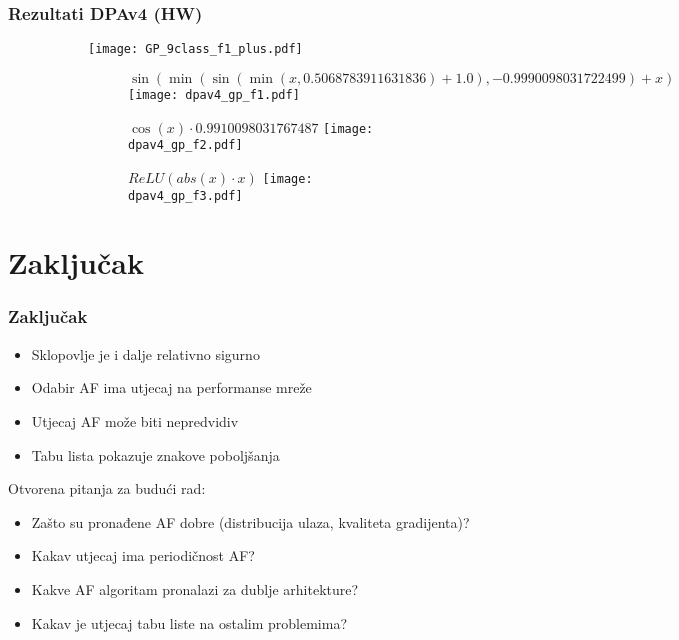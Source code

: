 \documentclass{beamer}
\begin{document}
\begin{frame}
\frametitle{Rezultati DPAv4 (HW)}

\begin{figure}
\centering
\begin{subfigure}{.49\textwidth}
  \centering
  \texttt{[image: GP\_9class\_f1\_plus.pdf]}
\end{subfigure}
\begin{subfigure}{.49\textwidth}
  \centering
  \begin{subfigure}{\linewidth}
    \centering
    \tiny $\sin (\min (\sin (\min (x,0.5068783911631836) + 1.0),-0.9990098031722499) + x)$
    \texttt{[image: dpav4\_gp\_f1.pdf]}
  \end{subfigure}
  \begin{subfigure}{\linewidth}
    \centering
    \vspace{2mm}
	\tiny $\cos (x) \cdot 0.9910098031767487$    
    \texttt{[image: dpav4\_gp\_f2.pdf]}
  \end{subfigure}
  \begin{subfigure}{\linewidth}
    \centering
    \vspace{2mm}
    \tiny $ReLU (abs (x) \cdot x)$
    \texttt{[image: dpav4\_gp\_f3.pdf]}
  \end{subfigure}
\end{subfigure}
\end{figure}

\end{frame}

\section{Zaključak}

\begin{frame}
\frametitle{Zaključak}

\begin{itemize}
\item Sklopovlje je i dalje relativno sigurno
\item Odabir AF ima utjecaj na performanse mreže
\item Utjecaj AF može biti nepredvidiv
\item Tabu lista pokazuje znakove poboljšanja
\end{itemize}

Otvorena pitanja za budući rad:

\begin{itemize}
\item Zašto su pronađene AF dobre (distribucija ulaza, kvaliteta gradijenta)?
\item Kakav utjecaj ima periodičnost AF?
\item Kakve AF algoritam pronalazi za dublje arhitekture?
\item Kakav je utjecaj tabu liste na ostalim problemima?
\end{itemize}

\end{frame}
\end{document}
